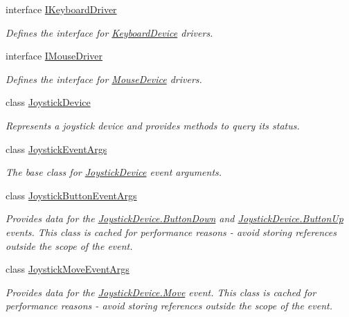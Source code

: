 \begin{DoxyCompactItemize}
interface \hyperlink{interface_open_t_k_1_1_input_1_1_i_keyboard_driver}{I\-Keyboard\-Driver}
\begin{DoxyCompactList}\small\item\em Defines the interface for \hyperlink{class_open_t_k_1_1_input_1_1_keyboard_device}{Keyboard\-Device} drivers. \end{DoxyCompactList}\item 
interface \hyperlink{interface_open_t_k_1_1_input_1_1_i_mouse_driver}{I\-Mouse\-Driver}
\begin{DoxyCompactList}\small\item\em Defines the interface for \hyperlink{class_open_t_k_1_1_input_1_1_mouse_device}{Mouse\-Device} drivers. \end{DoxyCompactList}\item 
class \hyperlink{class_open_t_k_1_1_input_1_1_joystick_device}{Joystick\-Device}
\begin{DoxyCompactList}\small\item\em Represents a joystick device and provides methods to query its status. \end{DoxyCompactList}\item 
class \hyperlink{class_open_t_k_1_1_input_1_1_joystick_event_args}{Joystick\-Event\-Args}
\begin{DoxyCompactList}\small\item\em The base class for \hyperlink{class_open_t_k_1_1_input_1_1_joystick_device}{Joystick\-Device} event arguments. \end{DoxyCompactList}\item 
class \hyperlink{class_open_t_k_1_1_input_1_1_joystick_button_event_args}{Joystick\-Button\-Event\-Args}
\begin{DoxyCompactList}\small\item\em Provides data for the \hyperlink{class_open_t_k_1_1_input_1_1_joystick_device_a677045ca3c8a2ac98095680bb5746ede}{Joystick\-Device.\-Button\-Down} and \hyperlink{class_open_t_k_1_1_input_1_1_joystick_device_a837891423d49811a2384c95f7576fbc2}{Joystick\-Device.\-Button\-Up} events. This class is cached for performance reasons -\/ avoid storing references outside the scope of the event. \end{DoxyCompactList}\item 
class \hyperlink{class_open_t_k_1_1_input_1_1_joystick_move_event_args}{Joystick\-Move\-Event\-Args}
\begin{DoxyCompactList}\small\item\em Provides data for the \hyperlink{class_open_t_k_1_1_input_1_1_joystick_device_ad9dcc4f6506c543d16e326c7ee08da39}{Joystick\-Device.\-Move} event. This class is cached for performance reasons -\/ avoid storing references outside the scope of the event. \end{DoxyCompactList}\item 

\end{DoxyCompactItemize}
